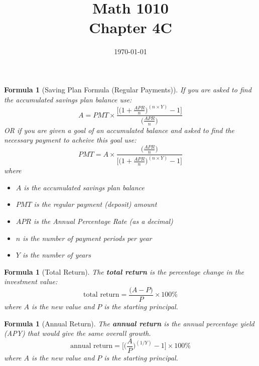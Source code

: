 \documentclass[12pt]{article}
\newtheorem{formula}[theorem]{Formula}
\begin{document}
\title{\bf Math 1010 \\ Chapter 4C\iftoggle{sol}{ Key}{} }
\date{\today}
\maketitle


\renewcommand{\theenumi}{\alph{enumi}}
\renewcommand{\labelenumi}{(\theenumi)}

\begin{formula}[Saving Plan Formula (Regular Payments)]
If you are asked to find the accumulated savings plan balance use:
	\begin{equation}\label{eq:savings_plan_regular}
		A = PMT \times \frac{\Big[\Big(1 + \frac{APR}{n}\Big)^{(n\times Y)} - 1\Big]}{\Big(\frac{APR}{n}\Big)}
	\end{equation}
	OR if you are given a goal of an accumulated balance and asked to find the necessary payment to acheive this goal use:
	\begin{equation}\label{eq:savings_plan_regular_pmt}
		PMT = A \times \frac{\Big(\frac{APR}{n}\Big)}{\Big[\Big(1 + \frac{APR}{n}\Big)^{(n\times Y)} - 1\Big]}
	\end{equation}
	where
	\begin{itemize}
		\item $A$ is the accumulated savings plan balance
		\item $PMT$ is the regular payment (deposit) amount
		\item $APR$ is the Annual Percentage Rate  (as a decimal)
		\item $n$ is the number of payment periods per year
		\item $Y$ is the number of years
	\end{itemize}
\end{formula}

\begin{formula}[Total Return]
	The {\bf total return} is the percentage change in the investment value:
	\begin{equation}\label{eq:total}
		\text{total return} = \frac{\Big(A-P\Big)}{P}\times 100\%
	\end{equation}
	where $A$ is the new value and $P$ is the starting principal.
\end{formula}

\begin{formula}[Annual Return]
	The {\bf annual return} is the annual percentage yield (APY) that would give the same overall growth.
	\begin{equation}\label{eq:annual}
		\text{annual return} = \Big[\Big(\frac{A}{P}\Big)^{(1 / Y)} - 1\Big] \times 100\%
	\end{equation}
	where $A$ is the new value and $P$ is the starting principal.
\end{formula}
\end{document}
